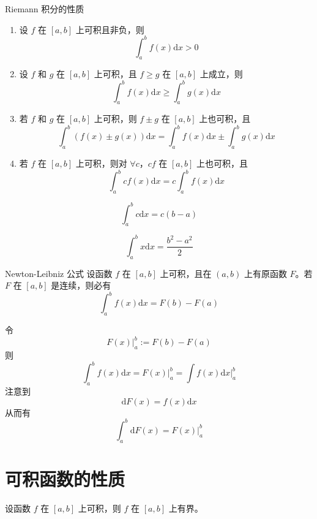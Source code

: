 \begin{theorem}{Riemann 积分的性质}
    \begin{enumerate}
        \item 设 $f$ 在 $[a,b]$ 上可积且非负，则
              \[\int_a^b f(x)\mathrm{d}x > 0\]
        \item 设 $f$ 和 $g$ 在 $[a,b]$ 上可积，且 $f \geqslant g$ 在 $[a,b]$ 上成立，则
              \[\int_a^b f(x)\mathrm{d}x \geqslant \int_a^b g(x)\mathrm{d}x\]
        \item 若 $f$ 和 $g$ 在 $[a,b]$ 上可积，则 $f \pm g$ 在 $[a,b]$ 上也可积，且
              \[\int_a^b(f(x)\pm g(x))\mathrm{d}x = \int_a^b f(x)\mathrm{d}x \pm \int_a^b g(x)\mathrm{d}x\]
        \item 若 $f$ 在 $[a,b]$ 上可积，则对 $\forall c$，$cf$ 在 $[a,b]$ 上也可积，且
              \[\int_a^b cf(x)\mathrm{d}x = c\int_{a}^{b} f(x)\mathrm{d}x\]
    \end{enumerate}
\end{theorem}

\hfill

\begin{example}
    \[\int_{a}^{b} c \mathrm{d}x = c(b - a)\]
\end{example}

\hfill

\begin{example}
    \[\int_{a}^{b} x \mathrm{d}x = \frac{b^2 - a^2}{2}\]
\end{example}

\begin{theorem}{Newton-Leibniz 公式}
    设函数 $f$ 在 $[a,b]$ 上可积，且在 $(a,b)$ 上有原函数 $F$。若 $F$ 在 $[a,b]$ 是连续，则必有
    \[\int_{a}^{b} f(x) \mathrm{d}x = F(b) - F(a)\]
\end{theorem}
令
\[F(x)\bigg|_a^b := F(b) - F(a)\]
则
\[\int_a^b f(x)\mathrm{d}x = F(x)\bigg|_a^b = \int f(x)\mathrm{d}x\bigg|_a^b\]
注意到
\[\mathrm{d}F(x) = f(x)\mathrm{d}x\]
从而有
\[\int_a^b \mathrm{d}F(x) = F(x)\bigg|_a^b\]


\section{可积函数的性质}

\begin{theorem}
    设函数 $f$ 在 $[a,b]$ 上可积，则 $f$ 在 $[a,b]$ 上有界。
\end{theorem}

